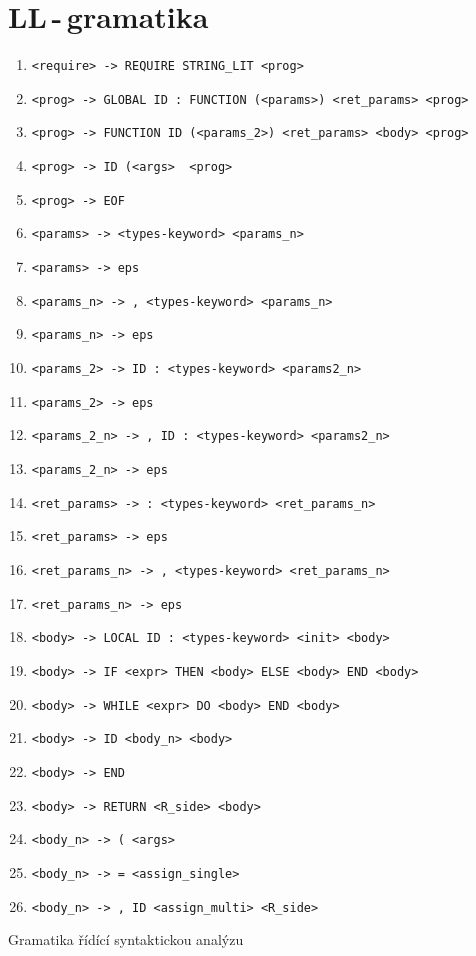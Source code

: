 \documentclass[11pt]{article}
\begin{document}
\section{LL\,-\,gramatika}
\begin{table}[H]
    \centering
    \begin{enumerate}
        \item \verb|<require> -> REQUIRE STRING_LIT <prog>|

        \item \verb|<prog> -> GLOBAL ID : FUNCTION (<params>) <ret_params> <prog>|
        \item \verb|<prog> -> FUNCTION ID (<params_2>) <ret_params> <body> <prog>|

        \item \verb|<prog> -> ID (<args>  <prog>|
        \item \verb|<prog> -> EOF|

        \item \verb|<params> -> <types-keyword> <params_n>|
        \item \verb|<params> -> eps|
        \item \verb|<params_n> -> , <types-keyword> <params_n>|
        \item \verb|<params_n> -> eps|

        \item \verb|<params_2> -> ID : <types-keyword> <params2_n>|
        \item \verb|<params_2> -> eps|
        \item \verb|<params_2_n> -> , ID : <types-keyword> <params2_n>|
        \item \verb|<params_2_n> -> eps|

        \item \verb|<ret_params> -> : <types-keyword> <ret_params_n>|
        \item \verb|<ret_params> -> eps|
        \item \verb|<ret_params_n> -> , <types-keyword> <ret_params_n>|
        \item \verb|<ret_params_n> -> eps|

        \item \verb|<body> -> LOCAL ID : <types-keyword> <init> <body>|
        \item \verb|<body> -> IF <expr> THEN <body> ELSE <body> END <body>|
        \item \verb|<body> -> WHILE <expr> DO <body> END <body>|
        \item \verb|<body> -> ID <body_n> <body>|
        \item \verb|<body> -> END|
        \item \verb|<body> -> RETURN <R_side> <body>|

        \item \verb|<body_n> -> ( <args>|
        \item \verb|<body_n> -> = <assign_single>|
        \item \verb|<body_n> -> , ID <assign_multi> <R_side>|

    \end{enumerate}
    \caption{Gramatika řídící syntaktickou analýzu}
    \label{tab:ll-gramatika}
\end{table}
\end{document}
